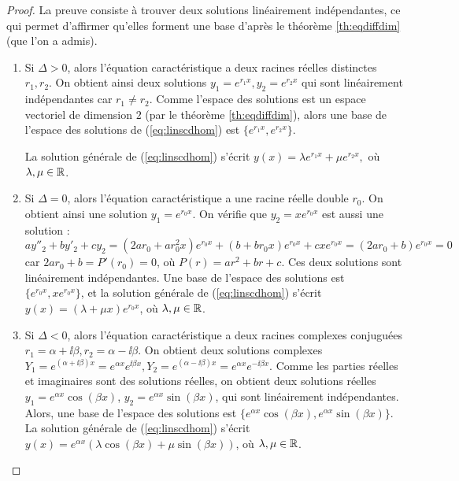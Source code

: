 \documentclass[class=report,crop=false]{standalone}
\begin{document}
\begin{proof}
La preuve consiste à trouver deux solutions linéairement indépendantes,
ce qui permet d'affirmer qu'elles forment une base d'après
le théorème \ref{th:eqdiffdim} (que l'on a admis).
\begin{enumerate}
  \item Si $\Delta>0$, alors l'équation caractéristique a deux racines réelles
distinctes $r_1, r_2$. On obtient ainsi deux solutions $y_1=e^{r_1x},
y_2=e^{r_2x}$ qui sont linéairement indépendantes car $r_1 \neq r_2$.
Comme l'espace des solutions est un espace vectoriel de dimension $2$
(par le théorème \ref{th:eqdiffdim}), alors une base de
l'espace des solutions de (\ref{eq:linscdhom})
est $\big\{e^{r_1x}, e^{r_2x}\big\}$.

La solution générale de  (\ref{eq:linscdhom}) s'écrit
$y(x) = \lambda e^{r_1x} + \mu e^{r_2x},$ où $\lambda,
\mu\in\mathbb{R}$.

  \item Si $\Delta=0$, alors l'équation caractéristique a
une racine réelle double $r_0$. On
obtient ainsi une solution $y_1=e^{r_0x}$. On vérifie que $y_2=xe^{r_0x}$
est aussi une solution :
$ay''_2+by'_2+cy_2=(2ar_0+ar_0^2x)e^{r_0x}+(b+br_0x)e^{r_0x}+cxe^{r_0x}
=(2ar_0+b)e^{r_0x}=0$ car $2ar_0+b=P'(r_0)=0$, où $P(r) = ar^2+br+c$.
Ces deux solutions sont linéairement indépendantes.
Une base de l'espace des solutions est $\big\{e^{r_0x}, xe^{r_0x}\big\}$,
et la solution générale de  (\ref{eq:linscdhom}) s'écrit
$y(x) = (\lambda  + \mu x) e^{r_0x}$, où $\lambda,\mu \in\mathbb{R}$.

  \item Si $\Delta<0$, alors l'équation caractéristique a deux
racines complexes conjuguées $r_1=\alpha+\ii\beta, r_2=\alpha-\ii\beta$.
On obtient deux solutions complexes $Y_1=e^{(\alpha+\ii\beta)x}=e^{\alpha x}e^{\ii\beta x},
Y_2=e^{(\alpha-\ii\beta)x}=e^{\alpha x}e^{-\ii\beta x}$.
Comme les parties réelles et imaginaires sont des
solutions réelles, on obtient deux solutions réelles
$y_1=e^{\alpha x}\cos(\beta x)$, $y_2=e^{\alpha x}\sin(\beta x)$, qui sont
linéairement indépendantes.
Alors, une base de l'espace des solutions est
$\big\{e^{\alpha x}\cos(\beta x), e^{\alpha x}\sin(\beta x)\big\}$.
La solution générale de (\ref{eq:linscdhom}) s'écrit
$y(x)=e^{\alpha x}(\lambda \cos(\beta x) +
\mu\sin(\beta x))$, où $\lambda,\mu \in \mathbb{R}$.
\end{enumerate}
\end{proof}

\end{document}
